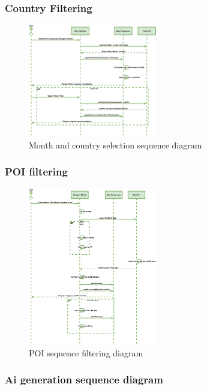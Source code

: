 \documentclass[]{project_final}
\begin{document}
\subsubsection{Country Filtering}

\begin{figure}[ht!]
  \centering
  \includegraphics[width=0.5\textwidth]{countryFiltering.png}
  \vspace*{0.0cm}
  \caption{Month and country selection sequence diagram}
  \label{fig:1}
\end{figure}
\newpage
\subsubsection{POI filtering}

\begin{figure}[ht!]
  \centering
  \includegraphics[width=0.5\textwidth]{TPpoiSequenceDiagram.png}
  \vspace*{0.0cm}
  \caption{POI sequence filtering diagram}
  \label{fig:1}
\end{figure}
\newpage
\subsubsection{Ai generation sequence diagram}
\end{document}
